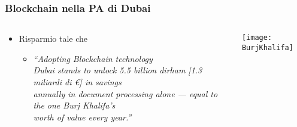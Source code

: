 \begin{frame}
 \frametitle{Blockchain nella PA di Dubai}


 \begin{columns}
 \begin{column}{0.7\textwidth}

   \begin{itemize}
  \item Risparmio tale che
  \begin{itemize}
   \item[] \emph{“Adopting Blockchain technology\\ Dubai stands to unlock 5.5
billion dirham [1.3 miliardi di \euro{}] in savings\\ annually in document
processing alone — equal to the one Burj Khalifa’s\\ worth of value every
year.” }
  \end{itemize}
 \end{itemize}

 \end{column}
 \begin{column}{0.5\textwidth}  %
 \begin{center}
 \texttt{[image: BurjKhalifa]}
 \end{center}
 \end{column}
 \end{columns}



\end{frame}
